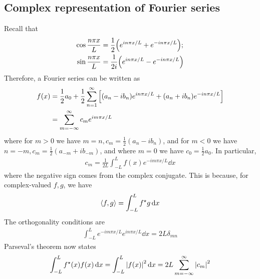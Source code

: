     \subsection{Complex representation of Fourier series}
    Recall that
    \begin{align*}
        \cos \frac{n \pi x}{L} & = \frac{1}{2}\qty(e^{i n \pi x / L} + e^{-i n \pi x / L}); \\
        \sin \frac{n \pi x}{L} & = \frac{1}{2i}\qty(e^{i n \pi x / L} - e^{-i n \pi x / L})
    \end{align*}
    Therefore, a Fourier series can be written as
    \begin{align*}
        f(x) & = \frac{1}{2} a_0 + \frac{1}{2} \sum_{n=1}^\infty \qty[ (a_n - i b_n) e^{i n \pi x / L} + (a_n + i b_n) e^{-i n \pi x / L} ] \\
            & = \sum_{m=-\infty}^\infty c_m e^{i m \pi x / L}
    \end{align*}
    where for $m > 0$ we have $m=n, c_m = \frac{1}{2}(a_n - ib_n)$, and for $m < 0$ we have $n = -m, c_m = \frac{1}{2}(a_{-m} + ib_{-m})$, and where $m = 0$ we have $c_0 = \frac{1}{2} a_0$.
    In particular,
    \begin{align*}
        c_m = \frac{1}{2L} \int_{-L}^L f(x) e^{-i m \pi x / L} \dd{x}
    \end{align*}
    where the negative sign comes from the complex conjugate.
    This is because, for complex-valued $f, g$, we have
    \begin{align*}
        \left\langle{f,g}\right\rangle = \int_{-L}^L f^\star g \dd{x}
    \end{align*}
    The orthogonality conditions are
    \begin{align*}
        \int_{-L}^L e^{-i m \pi x / L} e^{i n \pi x / L} \dd{x} = 2L \delta_{mn}
    \end{align*}
    Parseval's theorem now states
    \begin{align*}
        \int_{-L}^L f^\star(x) f(x) \dd{x} = \int_{-L}^L \abs{f(x)}^2 \dd{x} = 2L \sum_{m=-\infty}^\infty \abs{c_m}^2
    \end{align*}

